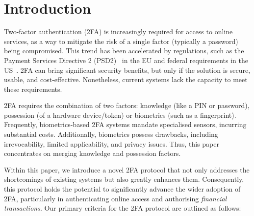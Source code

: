 


\section{Introduction}

Two-factor authentication (2FA) is increasingly required for access to online services, as a way to mitigate the risk of a single factor (typically a password) being compromised.
This trend has been accelerated by regulations, such as the Payment Services Directive 2 (PSD2)~\cite{psd2} in the EU and federal requirements in the US~\cite{Zero-Trust-Cybersecurity}.
2FA can bring significant security benefits, but only if the solution is secure, usable, and cost-effective. Nonetheless, current systems lack the capacity to meet these requirements.


2FA requires the combination of two factors: knowledge (like a PIN or password), possession (of a hardware device/token) or biometrics (such as a fingerprint). Frequently, biometrics-based 2FA systems mandate specialised sensors, incurring substantial costs. 
Additionally, biometrics possess drawbacks, including irrevocability, limited applicability, and privacy issues.  Thus, this paper concentrates on merging knowledge and possession factors.




Within this paper, we introduce a novel 2FA protocol that not only addresses the shortcomings of existing systems but also greatly enhances them.  Consequently, this protocol holds the potential to significantly advance the wider adoption of 2FA, particularly in authenticating online access and authorising \emph{financial transactions}. 
%
Our primary criteria for the 2FA protocol are outlined as follows:


